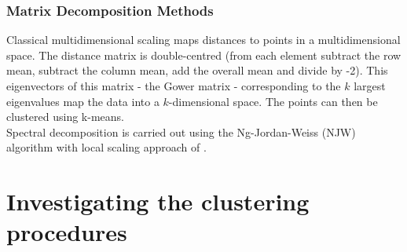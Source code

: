 \documentclass[11pt]{article}
\begin{document}

\subsubsection{Matrix Decomposition Methods}
Classical multidimensional scaling maps distances to points in a multidimensional space. The distance matrix is double-centred (from each element subtract the row mean, subtract the column mean, add the overall mean and divide by -2). This eigenvectors of this matrix - the Gower matrix - corresponding to the $k$ largest eigenvalues map the data into a $k$-dimensional space. The points can then be clustered using k-means.\\
Spectral decomposition is carried out using the Ng-Jordan-Weiss (NJW) algorithm \citep{Ng:2002tj} with local scaling approach of \citet{Perona:2004tk}.


\section{Investigating the clustering procedures}


\newpage


\end{document}
